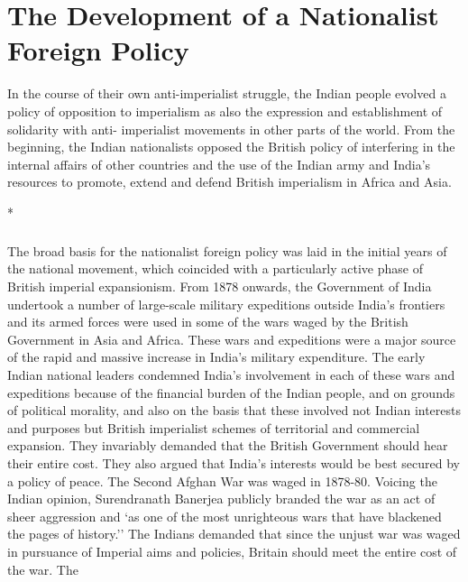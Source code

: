\cleardoublepage
\chapter{The Development of a Nationalist Foreign Policy}



In the course of their own anti-imperialist struggle, the Indian people evolved a policy of opposition to imperialism as also the expression and establishment of solidarity with anti- imperialist movements in other parts of the world. From the beginning, the Indian nationalists opposed the British policy of interfering in the internal affairs of other countries and the use of the Indian army and India's resources to promote, extend and defend British imperialism in Africa and Asia.

\begin{center}*\end{center}

\paragraph*{}


The broad basis for the nationalist foreign policy was laid in the initial years of the national movement, which coincided with a particularly active phase of British imperial expansionism. From 1878 onwards, the Government of India undertook a number of large-scale military expeditions outside India's frontiers and its armed forces were used in some of the wars waged by the British Government in Asia and Africa. These wars and expeditions were a major source of the rapid and massive increase in India's military expenditure. The early Indian national leaders condemned India's involvement in each of these wars and expeditions because of the financial burden of the Indian people, and on grounds of political morality, and also on the basis that these involved not Indian interests and purposes but British imperialist schemes of territorial and commercial expansion. They invariably demanded that the British Government should hear their entire cost. They also argued that India's interests would be best secured by a policy of peace. The Second Afghan War was waged in 1878-80. Voicing the Indian opinion, Surendranath Banerjea publicly branded the war as an act of sheer aggression and `as one of the most unrighteous wars that have blackened the pages of history.'' The Indians demanded that since the unjust war was waged in pursuance of Imperial aims and policies, Britain should meet the entire cost of the war. The 

